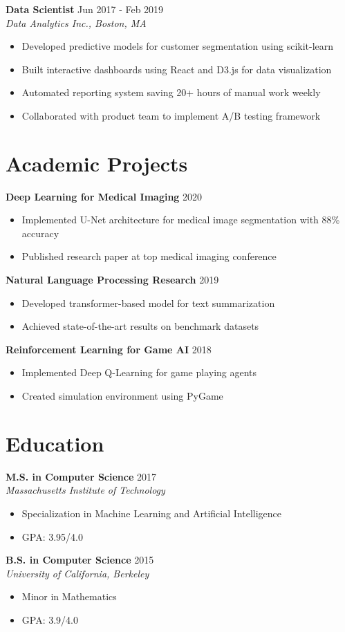 \documentclass[11pt]{article}
\begin{document}
\textbf{Data Scientist} \hfill Jun 2017 - Feb 2019\\
\textit{Data Analytics Inc., Boston, MA}
\begin{itemize}[leftmargin=*]
    \item Developed predictive models for customer segmentation using scikit-learn
    \item Built interactive dashboards using React and D3.js for data visualization
    \item Automated reporting system saving 20+ hours of manual work weekly
    \item Collaborated with product team to implement A/B testing framework
\end{itemize}

\section*{Academic Projects}
\textbf{Deep Learning for Medical Imaging} \hfill 2020
\begin{itemize}[leftmargin=*]
    \item Implemented U-Net architecture for medical image segmentation with 88\% accuracy
    \item Published research paper at top medical imaging conference
\end{itemize}

\textbf{Natural Language Processing Research} \hfill 2019
\begin{itemize}[leftmargin=*]
    \item Developed transformer-based model for text summarization
    \item Achieved state-of-the-art results on benchmark datasets
\end{itemize}

\textbf{Reinforcement Learning for Game AI} \hfill 2018
\begin{itemize}[leftmargin=*]
    \item Implemented Deep Q-Learning for game playing agents
    \item Created simulation environment using PyGame
\end{itemize}

\section*{Education}
\textbf{M.S. in Computer Science} \hfill 2017\\
\textit{Massachusetts Institute of Technology}
\begin{itemize}[leftmargin=*]
    \item Specialization in Machine Learning and Artificial Intelligence
    \item GPA: 3.95/4.0
\end{itemize}

\textbf{B.S. in Computer Science} \hfill 2015\\
\textit{University of California, Berkeley}
\begin{itemize}[leftmargin=*]
    \item Minor in Mathematics
    \item GPA: 3.9/4.0
\end{itemize}
\end{document}
